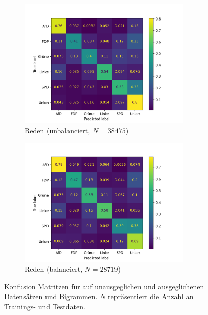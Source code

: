 \begin{figure}[H]
    \begin{subfigure}{0.5\textwidth}
      \centering
      \includegraphics[width=0.9\textwidth]{data/images/modeling/fasttext/none/speeches_confusion_matrix.png}
      \caption{Reden (unbalanciert, \(N = \num{38475}\))} \label{sfig:confusionMatrixFastTextSpeeches}
    \end{subfigure}
    \begin{subfigure}{0.5\textwidth}
      \centering
      \includegraphics[width=0.9\textwidth]{data/images/modeling/fasttext/under/speeches_confusion_matrix.png}
      \caption{Reden (balanciert, \(N = \num{28719}\))} \label{sfig:confusionMatrixFastTextSpeechesBalanced}
    \end{subfigure}
    
    \caption[Konfusion Matritzen für \ft auf unausgeglichen und ausgeglichenen Datensätzen]{Konfusion Matritzen für \ft auf unausgeglichen und ausgeglichenen Datensätzen und Bigrammen. \(N\) repräsentiert die Anzahl an Trainings- und Testdaten.} \label{fig:confusionMatrixFastText}
\end{figure}

